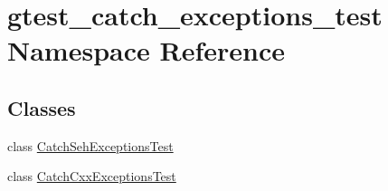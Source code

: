 \hypertarget{namespacegtest__catch__exceptions__test}{\section{gtest\-\_\-catch\-\_\-exceptions\-\_\-test Namespace Reference}
\label{namespacegtest__catch__exceptions__test}
}
\subsection*{Classes}
\begin{DoxyCompactItemize}
\item 
class \hyperlink{classgtest__catch__exceptions__test_1_1_catch_seh_exceptions_test}{Catch\-Seh\-Exceptions\-Test}
\item 
class \hyperlink{classgtest__catch__exceptions__test_1_1_catch_cxx_exceptions_test}{Catch\-Cxx\-Exceptions\-Test}
\end{DoxyCompactItemize}
